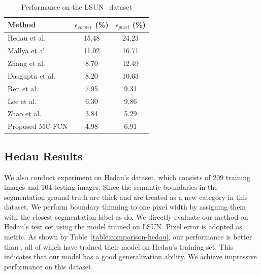 \begin{table}
	\centering 
	\begin{tabular}{lcc}
		\toprule
		Method & $\epsilon_{corner}$ (\%) & $\epsilon_{pixel}$ (\%) \\
		\midrule
		Hedau et al.~\cite{hedau2009recovering} & 15.48 & 24.23 \\
		Mallya et al.~\cite{mallya2015learning} & 11.02 & 16.71 \\
		Zhang et al.~\cite{zhang2017learning} & 8.70 & 12.49 \\
		Dasgupta et al.~\cite{dasgupta2016delay} & 8.20 & 10.63 \\
		Ren et al.~\cite{ren2016coarse} & 7.95 & 9.31 \\
		Lee et al.~\cite{LeeRoomNet17} & 6.30 & 9.86 \\
		Zhao et al.~\cite{zhao2017physics} & 3.84 & 5.29 \\
		\midrule
		Proposed MC-FCN & 4.98 & 6.91 \\
		\bottomrule
	\end{tabular}
	\caption{Performance on the LSUN~\cite{zhang2015large} dataset}	
	\label{table:comparison-lsun}
\end{table}

\subsection{Hedau Results}
\label{sec:Hedau}
We also conduct experiment on Hedau's \cite{hedau2009recovering} dataset, which consists of 209 training images and 104 testing images. Since the semantic boundaries in the segmentation ground truth are thick and are treated as a new category in this dataset. We perform boundary thinning to one pixel width by assigning them with the closest segmentation label as \cite{LeeRoomNet17} do. We directly evaluate our method on Hedau's test set using the model trained on LSUN. Pixel error is adopted as metric. As shown by Table~\ref{table:comparison-hedau}, our performance is better than \cite{mallya2015learning,zhang2017learning,ren2016coarse}, all of which have trained their model on Hedau's training set. This indicates that our model has a good generalization ability. We achieve impressive performance on this dataset.

